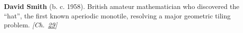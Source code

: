 \textbf{David Smith} (b. c. 1958). British amateur mathematician who discovered the ``hat'', the first known aperiodic monotile, resolving a major geometric tiling problem. \emph{[Ch.~\hyperref[ch:hatmonotile]{29}]}

